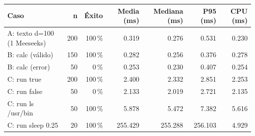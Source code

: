 \begin{tabular}{lrrrrrr}
\toprule
Caso & n & Éxito & Media (ms) & Mediana (ms) & P95 (ms) & CPU (ms) \\
\midrule
A: texto d=100 (1 Meeseeks) & 200 & 100\,\% & 0.319 & 0.276 & 0.531 & 0.230 \\
B: calc (válido) & 150 & 100\,\% & 0.282 & 0.256 & 0.376 & 0.278 \\
B: calc (error) & 50 & 0\,\% & 0.253 & 0.230 & 0.407 & 0.254 \\
C: run true & 200 & 100\,\% & 2.400 & 2.332 & 2.851 & 2.253 \\
C: run false & 50 & 0\,\% & 2.133 & 2.019 & 2.721 & 2.135 \\
C: run ls /usr/bin & 50 & 100\,\% & 5.878 & 5.472 & 7.382 & 5.616 \\
C: run sleep 0.25 & 20 & 100\,\% & 255.429 & 255.288 & 256.103 & 4.929 \\
\bottomrule
\end{tabular}

